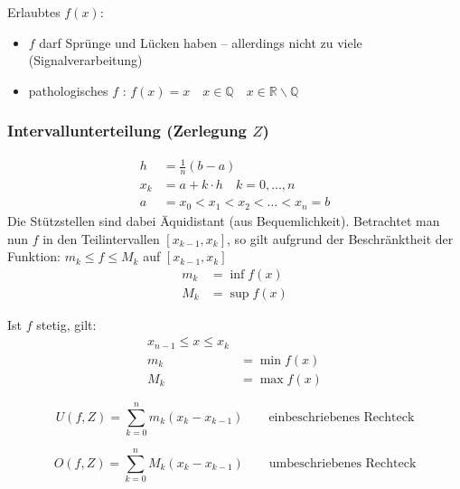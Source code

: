 Erlaubtes \( f(x) \):
\begin{itemize}
	\item \( f \) darf Sprünge und Lücken haben – allerdings nicht zu viele (Signalverarbeitung)
	\item pathologisches \( f \) : \( f(x) = x \quad x \in \mathbb{Q} \quad x \in \mathbb{R}\backslash\mathbb{Q} \)
\end{itemize}

\subsubsection*{Intervallunterteilung  (Zerlegung $Z$)}

\begin{align*}
	h &= \frac{1}{n} (b-a) \\
	x_k &= a+k \cdot h \quad k=0,\ldots,n \\
	a &= x_0<x_1<x_2<\ldots<x_n=b 
\end{align*}
Die Stützstellen sind dabei Äquidistant (aus Bequemlichkeit). Betrachtet man nun \(f\) in den Teilintervallen \( [x_{k-1},x_k] \), so gilt aufgrund der Beschränktheit der Funktion: \( m_k \leq f \leq M_k \) auf \( [x_{k-1},x_k] \)
\begin{align*}
	m_k &= \inf f(x) \\
	M_k &= \sup f(x)
\end{align*}

\begin{note}
	Ist \( f \) stetig, gilt:
	\begin{align*}
		x_{n-1} \leq x \leq x_k \\
		m_k &= \min f(x) \\
		M_k &= \max f(x)
	\end{align*}	
\end{note}

\begin{definition}
	\[
		U(f, Z)= \sum_{k=0}^nm_k(x_k-x_{k-1}) \qquad \text{einbeschriebenes Rechteck}
	\]
\end{definition}


\begin{definition}
	\[
		O(f, Z)= \sum_{k=0}^nM_k(x_k-x_{k-1})  \qquad \text{umbeschriebenes Rechteck}
	\]
\end{definition}

